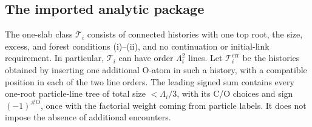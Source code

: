 \subsection{The imported analytic package}

The one-slab class \(\mathcal T_i\) consists of connected histories
with one top root, the size, excess, and forest conditions (i)--(ii),
and no continuation or initial-link requirement. In particular,
\(\mathcal T_i\) can have order \(\Lambda_i^2\) lines. Let
\(\mathcal T_i^{\mathrm{err}}\) be the histories obtained by inserting
one additional O-atom in such a history, with a compatible position
in each of the two line orders. The leading signed sum contains every
one-root particle-line tree of total size \(<\Lambda_i/3\), with its
C/O choices and sign \((-1)^{\#\mathrm O}\), once with the factorial
weight coming from particle labels. It does not impose the absence of
additional encounters.

